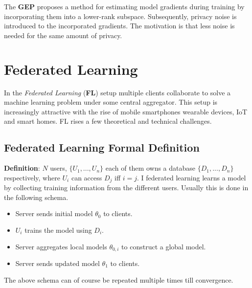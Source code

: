 \documentclass[fourier]{_style/dissertation}
\begin{document}
The \textbf{GEP} \cite{Yu2021DoLearning} proposes a method for estimating model gradients during training by incorporating them into a lower-rank subspace. Subsequently, privacy noise is introduced to the incorporated gradients. The motivation is that less noise is needed for the same amount of privacy. \\


\section{Federated Learning}
In the \textit{Federated Learning} (\textbf{FL}) setup multiple clients collaborate to solve a machine learning problem under some central aggregator. This setup is increasingly attractive with the rise of mobile smartphones wearable devices, IoT and smart homes. FL rises a few theoretical and technical challenges.

\subsection{Federated Learning Formal Definition}
\textbf{Definition}: $N$ users, $\{U_{1},...,U_{n}\}$ each of them owns a database  $\{D_{1},...,D_{n} \}$ respectively, where $U_{i}$ can access $D_{j}$ iff $i=j$. I federated learning learns a model by collecting training information from the different users. Usually this is done in the following schema.
\begin{itemize}
    \item Server sends initial model $\theta_{0}$ to clients.
    \item $U_{i}$ trains the model using $D_{i}$.
    \item Server aggregates local models $\theta_{0,i}$ to construct a global model.
    \item Server sends updated model $\theta_{1}$ to clients.
\end{itemize}
The above schema can of course be repeated multiple times till convergence.
\end{document}
